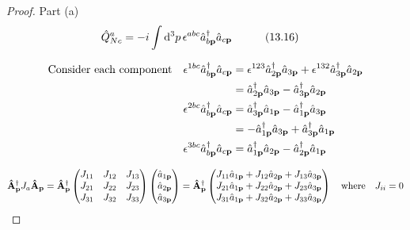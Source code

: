 \documentclass[letterpaper]{article}
\theoremstyle{definition}
\begin{document}
\begin{proof}Part (a)
  \[\hat{Q}^a_{Nc}                                                           =-i\int\dd[3]{p}\epsilon^{abc}\hat{a}^\dagger_{b\vb{p}}\hat{a}_{c\vb{p}}\qquad\qq{(13.16)}                         \]

  \begin{align*}
    \qq*{Consider each component}\epsilon^{1bc}\hat{a}^\dagger_{b\vb{p}}\hat{a}_{c\vb{p}} & =\epsilon^{123}\hat{a}^\dagger_{2\vb{p}}\hat{a}_{3\vb{p}}+\epsilon^{132}\hat{a}^\dagger_{3\vb{p}}\hat{a}_{2\vb{p}} \\
                                                                                          & =\hat{a}^\dagger_{2\vb{p}}\hat{a}_{3\vb{p}}-\hat{a}^\dagger_{3\vb{p}}\hat{a}_{2\vb{p}}                             \\
    \epsilon^{2bc}\hat{a}^\dagger_{b\vb{p}}\hat{a}_{c\vb{p}}                              & =\hat{a}^\dagger_{3\vb{p}}\hat{a}_{1\vb{p}}-\hat{a}^\dagger_{1\vb{p}}\hat{a}_{3\vb{p}}                             \\
                                                                                          & =-\hat{a}^\dagger_{1\vb{p}}\hat{a}_{3\vb{p}}+\hat{a}^\dagger_{3\vb{p}}\hat{a}_{1\vb{p}}                            \\
    \epsilon^{3bc}\hat{a}^\dagger_{b\vb{p}}\hat{a}_{c\vb{p}}                              & =\hat{a}^\dagger_{1\vb{p}}\hat{a}_{2\vb{p}}-\hat{a}^\dagger_{2\vb{p}}\hat{a}_{1\vb{p}}                             \\
  \end{align*}

  \[\vb{\hat{A}}^\dagger_{\vb{p}}J_a\vb{\hat{A}}_{\vb{p}}=\vb{\hat{A}}^\dagger_{\vb{p}}\begin{pmatrix}
      J_{11} & J_{12} & J_{13} \\
      J_{21} & J_{22} & J_{23} \\
      J_{31} & J_{32} & J_{33} \\
    \end{pmatrix}\begin{pmatrix}
      \hat{a}_{1\vb{p}} \\
      \hat{a}_{2\vb{p}} \\
      \hat{a}_{3\vb{p}} \\
    \end{pmatrix}=\vb{\hat{A}}^\dagger_{\vb{p}}\begin{pmatrix}
      J_{11}\hat{a}_{1\vb{p}} + J_{12}\hat{a}_{2\vb{p}} + J_{13}\hat{a}_{3\vb{p}} \\
      J_{21}\hat{a}_{1\vb{p}} + J_{22}\hat{a}_{2\vb{p}} + J_{23}\hat{a}_{3\vb{p}} \\
      J_{31}\hat{a}_{1\vb{p}} + J_{32}\hat{a}_{2\vb{p}} + J_{33}\hat{a}_{3\vb{p}} \\
    \end{pmatrix}\qq{where} J_{ii}=0\]


\end{proof}
\end{document}
